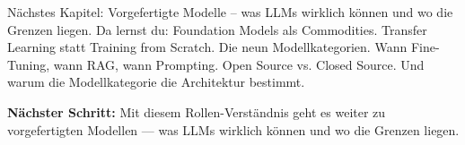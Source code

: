 \par\mbox{}\par
\begin{AUTORnotizEnv}
Nächstes Kapitel: Vorgefertigte Modelle -- was LLMs wirklich können und wo die Grenzen liegen.
Da lernst du: Foundation Models als Commodities. Transfer Learning statt Training from Scratch. Die neun Modellkategorien. Wann Fine-Tuning, wann RAG, wann Prompting. Open Source vs. Closed Source. Und warum die Modellkategorie die Architektur bestimmt.
\end{AUTORnotizEnv}

\textbf{Nächster Schritt:} Mit diesem Rollen-Verständnis geht es weiter zu vorgefertigten Modellen — was LLMs wirklich können und wo die Grenzen liegen.
\endinput

\clearpage
